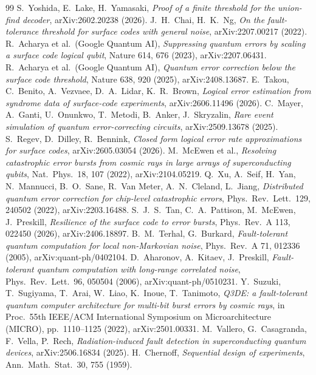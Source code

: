 \documentclass[a4paper,11pt]{article}
\theoremstyle{plain}
\theoremstyle{definition}
\theoremstyle{remark}
\begin{document}
\begin{thebibliography}{99}
 S.~Yoshida, E.~Lake, H.~Yamasaki, \emph{Proof of a finite threshold for the union-find decoder}, arXiv:2602.20238 (2026).
 J.~H.~Chai, H.~K.~Ng, \emph{On the fault-tolerance threshold for surface codes with general noise}, arXiv:2207.00217 (2022).
 R.~Acharya et al.\ (Google Quantum AI), \emph{Suppressing quantum errors by scaling a surface code logical qubit}, Nature 614, 676 (2023), arXiv:2207.06431.
 R.~Acharya et al.\ (Google Quantum AI), \emph{Quantum error correction below the surface code threshold}, Nature 638, 920 (2025), arXiv:2408.13687.
 E.~Takou, C.~Benito, A.~Vezvaee, D.~A.~Lidar, K.~R.~Brown, \emph{Logical error estimation from syndrome data of surface-code experiments}, arXiv:2606.11496 (2026).
 C.~Mayer, A.~Ganti, U.~Onunkwo, T.~Metodi, B.~Anker, J.~Skryzalin, \emph{Rare event simulation of quantum error-correcting circuits}, arXiv:2509.13678 (2025).
 S.~Regev, D.~Dilley, R.~Bennink, \emph{Closed form logical error rate approximations for surface codes}, arXiv:2605.03054 (2026).
 M.~McEwen et al., \emph{Resolving catastrophic error bursts from cosmic rays in large arrays of superconducting qubits}, Nat.\ Phys.\ 18, 107 (2022), arXiv:2104.05219.
 Q.~Xu, A.~Seif, H.~Yan, N.~Mannucci, B.~O.~Sane, R.~Van Meter, A.~N.~Cleland, L.~Jiang, \emph{Distributed quantum error correction for chip-level catastrophic errors}, Phys.\ Rev.\ Lett.\ 129, 240502 (2022), arXiv:2203.16488.
 S.~J.~S.~Tan, C.~A.~Pattison, M.~McEwen, J.~Preskill, \emph{Resilience of the surface code to error bursts}, Phys.\ Rev.\ A 113, 022450 (2026), arXiv:2406.18897.
 B.~M.~Terhal, G.~Burkard, \emph{Fault-tolerant quantum computation for local non-Markovian noise}, Phys.\ Rev.\ A 71, 012336 (2005), arXiv:quant-ph/0402104.
 D.~Aharonov, A.~Kitaev, J.~Preskill, \emph{Fault-tolerant quantum computation with long-range correlated noise}, Phys.\ Rev.\ Lett.\ 96, 050504 (2006), arXiv:quant-ph/0510231.
 Y.~Suzuki, T.~Sugiyama, T.~Arai, W.~Liao, K.~Inoue, T.~Tanimoto, \emph{Q3DE: a fault-tolerant quantum computer architecture for multi-bit burst errors by cosmic rays}, in Proc.\ 55th IEEE/ACM International Symposium on Microarchitecture (MICRO), pp.~1110--1125 (2022), arXiv:2501.00331.
 M.~Vallero, G.~Casagranda, F.~Vella, P.~Rech, \emph{Radiation-induced fault detection in superconducting quantum devices}, arXiv:2506.16834 (2025).
 H.~Chernoff, \emph{Sequential design of experiments}, Ann.\ Math.\ Stat.\ 30, 755 (1959).

\end{thebibliography}
\end{document}
